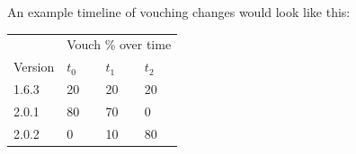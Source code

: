 \documentclass[]{article}
\makeatletter
\DeclareRobustCommand{\_}{%
  \leavevmode\vbox{%
    \hrule\@width.5em
          \@height-.26ex
          \@depth\dimexpr.26ex+.28pt\relax}}
\makeatother
\begin{document}
\pagebreak

  An example timeline of vouching changes would look like this:

\begin{longtable}[]{@{}llll@{}}
\toprule
  & \multicolumn{3}{c}{Vouch \% over time} \tabularnewline\cmidrule{2-4}
\begin{minipage}[t]{0.1\columnwidth}\centering\strut
{Version}\strut
\end{minipage} & \begin{minipage}[t]{0.1\columnwidth}\centering\strut
{$t_0$}\strut
\end{minipage} & \begin{minipage}[t]{0.1\columnwidth}\centering\strut
{$t_1$}\strut
\end{minipage} & \begin{minipage}[t]{0.1\columnwidth}\centering\strut
{$t_2$}\strut
\end{minipage}\tabularnewline \midrule
\begin{minipage}[t]{0.1\columnwidth}\centering\strut
{1.6.3}\strut
\end{minipage} & \begin{minipage}[t]{0.1\columnwidth}\centering\strut
{20}\strut
\end{minipage} & \begin{minipage}[t]{0.1\columnwidth}\centering\strut
{20}\strut
\end{minipage} & \begin{minipage}[t]{0.1\columnwidth}\centering\strut
{20}\strut
\end{minipage}\tabularnewline
\begin{minipage}[t]{0.1\columnwidth}\centering\strut
{2.0.1}\strut
\end{minipage} & \begin{minipage}[t]{0.1\columnwidth}\centering\strut
{80}\strut
\end{minipage} & \begin{minipage}[t]{0.1\columnwidth}\centering\strut
{70}\strut
\end{minipage} & \begin{minipage}[t]{0.1\columnwidth}\centering\strut
{0}\strut
\end{minipage}\tabularnewline
\begin{minipage}[t]{0.1\columnwidth}\centering\strut
{2.0.2}\strut
\end{minipage} & \begin{minipage}[t]{0.1\columnwidth}\centering\strut
{0}\strut
\end{minipage} & \begin{minipage}[t]{0.1\columnwidth}\centering\strut
{10}\strut
\end{minipage} & \begin{minipage}[t]{0.1\columnwidth}\centering\strut
{80}\strut
\end{minipage}\tabularnewline
\bottomrule
\end{longtable}
\end{document}
